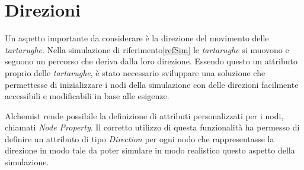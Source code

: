 \section{Direzioni}
Un aspetto importante da considerare è la direzione del movimento delle \textit{tartarughe}. Nella simulazione di riferimento\space\ref{refSim} le \textit{tartarughe}
si muovono e seguono un percorso che deriva dalla loro direzione. Essendo questo un attributo proprio delle \textit{tartarughe},
è stato necessario sviluppare una soluzione che permettesse di inizializzare i nodi della simulazione con delle direzioni facilmente accessibili 
e modificabili in base alle esigenze.

Alchemist rende possibile la definizione di attributi personalizzati per i nodi, chiamati \textit{Node Property}. Il corretto utilizzo di questa
funzionalità ha permesso di definire un attributo di tipo \textit{Direction} per ogni nodo che rappresentasse la direzione 
in modo tale da poter simulare in modo realistico questo aspetto della simulazione.